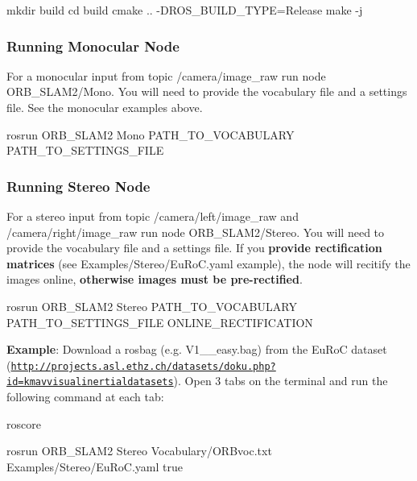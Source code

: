 \begin{DoxyCode}
mkdir build
cd build
cmake .. -DROS\_BUILD\_TYPE=Release
make -j
\end{DoxyCode}


\subsubsection*{Running Monocular Node}

For a monocular input from topic {\ttfamily /camera/image\+\_\+raw} run node O\+R\+B\+\_\+\+S\+L\+A\+M2/\+Mono. You will need to provide the vocabulary file and a settings file. See the monocular examples above.


\begin{DoxyCode}
rosrun ORB\_SLAM2 Mono PATH\_TO\_VOCABULARY PATH\_TO\_SETTINGS\_FILE
\end{DoxyCode}


\subsubsection*{Running Stereo Node}

For a stereo input from topic {\ttfamily /camera/left/image\+\_\+raw} and {\ttfamily /camera/right/image\+\_\+raw} run node O\+R\+B\+\_\+\+S\+L\+A\+M2/\+Stereo. You will need to provide the vocabulary file and a settings file. If you {\bfseries provide rectification matrices} (see Examples/\+Stereo/\+Eu\+Ro\+C.\+yaml example), the node will recitify the images online, {\bfseries otherwise images must be pre-\/rectified}.


\begin{DoxyCode}
rosrun ORB\_SLAM2 Stereo PATH\_TO\_VOCABULARY PATH\_TO\_SETTINGS\_FILE ONLINE\_RECTIFICATION
\end{DoxyCode}


{\bfseries Example}\+: Download a rosbag (e.\+g. V1\+\_\+\_\+easy.\+bag) from the Eu\+RoC dataset (\href{http://projects.asl.ethz.ch/datasets/doku.php?id=kmavvisualinertialdatasets}{\tt http\+://projects.\+asl.\+ethz.\+ch/datasets/doku.\+php?id=kmavvisualinertialdatasets}). Open 3 tabs on the terminal and run the following command at each tab\+: 
\begin{DoxyCode}
roscore
\end{DoxyCode}



\begin{DoxyCode}
rosrun ORB\_SLAM2 Stereo Vocabulary/ORBvoc.txt Examples/Stereo/EuRoC.yaml true
\end{DoxyCode}



